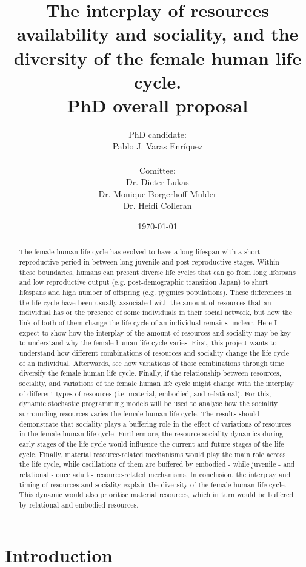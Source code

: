 \documentclass{article}
\title{
The interplay of resources availability and sociality, and the diversity of the female human life cycle.\\
PhD overall proposal}
\author{PhD candidate:\\
Pablo J. Varas Enríquez\\\\
Comittee:\\
Dr. Dieter Lukas\\
Dr. Monique Borgerhoff Mulder\\
Dr. Heidi Colleran}
\date{\today}
\begin{document}
\maketitle

\tableofcontents

\begin{abstract}
    The female human life cycle has evolved to have a long lifespan with a short reproductive period in between long juvenile and post-reproductive stages. Within these boundaries, humans can present diverse life cycles that can go from long lifespans and low reproductive output (e.g. post-demographic transition Japan) to short lifespans and high number of offspring (e.g. pygmies populations). These differences in the life cycle have been usually associated with the amount of resources that an individual has or the presence of some individuals in their social network, but how the link of both of them change the life cycle of an individual remains unclear. Here I expect to show how the interplay of the amount of resources and sociality may be key to understand why the female human life cycle varies. First, this project wants to understand how different combinations of resources and sociality change the life cycle of an individual. Afterwards, see how variations of these combinations through time diversify the female human life cycle. Finally, if the relationship between resources, sociality, and variations of the female human life cycle might change with the interplay of different types of resources (i.e. material, embodied, and relational). For this, dynamic stochastic programming models will be used to analyse how the sociality surrounding resources varies the female human life cycle. The results should demonstrate that sociality plays a buffering role in the effect of variations of resources in the female human life cycle. Furthermore, the resource-sociality dynamics during early stages of the life cycle would influence the current and future stages of the life cycle. Finally, material resource-related mechanisms would play the main role across the life cycle, while oscillations of them are buffered by embodied - while juvenile - and relational - once adult - resource-related mechanisms. In conclusion, the interplay and timing of resources and sociality explain the diversity of the female human life cycle. This dynamic would also prioritise material resources, which in turn would be buffered by relational and embodied resources.
\end{abstract}

\section{Introduction}
\end{document}

